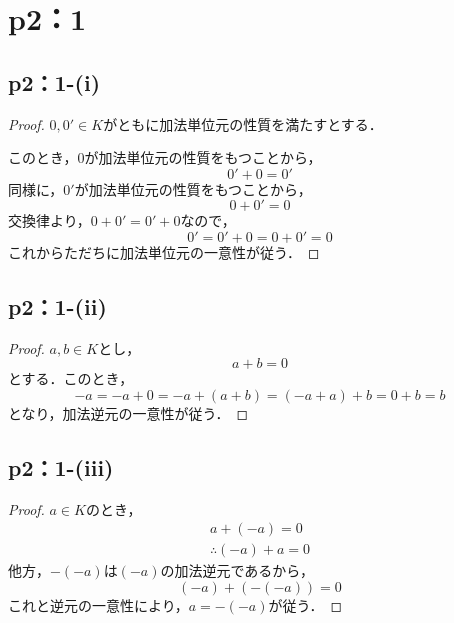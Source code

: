 \documentclass[a4paper,10pt,fleqn]{ltjsarticle}
\begin{document}
\section*{p2：1}


\subsection*{p2：1-(i)}

\begin{leftbar}
    \begin{proof}
        $0,0' \in K$がともに加法単位元の性質を満たすとする．

        このとき，$0$が加法単位元の性質をもつことから，
        \[
            0'+0=0'
        \]
        同様に，$0'$が加法単位元の性質をもつことから，
        \[
            0+0' = 0
        \]
        交換律より，$0+0'=0'+0$なので，
        \[
            0'=0'+0 =0+0' =0
        \]
        これからただちに加法単位元の一意性が従う．
    \end{proof}
\end{leftbar}

\subsection*{p2：1-(ii)}

\begin{leftbar}
    \begin{proof}
        $a ,b \in K$とし，
        \[
            a+b =0
        \]
        とする．このとき，
        \[
            -a = -a+0 = -a +(a+b)=(-a+a)+b =0+b = b
        \]
        となり，加法逆元の一意性が従う．
    \end{proof}
\end{leftbar}

\subsection*{p2：1-(iii)}

\begin{leftbar}
    \begin{proof}
        $a \in K$のとき，
        \begin{gather*}
            a+(-a)=0 \\
            \therefore (-a)+a =0
        \end{gather*}
        他方，$-(-a)$は$(-a)$の加法逆元であるから，
        \[
            (-a)+(-(-a))=0
        \]
        これと逆元の一意性により，$a=-(-a)$が従う．
    \end{proof}
\end{leftbar}
\end{document}
